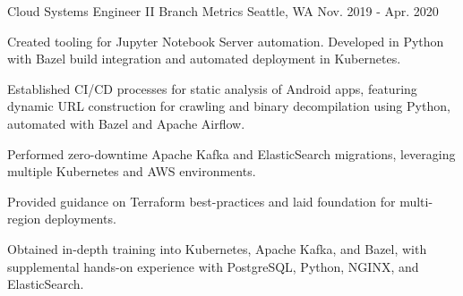 


\begin{cventries}

\cventry
{Cloud Systems Engineer II}
{Branch Metrics}
{Seattle, WA}
{Nov. 2019 - Apr. 2020}
{
\begin{cvitems}
\item {Created tooling for Jupyter Notebook Server automation. Developed in Python with Bazel build integration and automated deployment in Kubernetes.}
\item {Established CI/CD processes for static analysis of Android apps, featuring dynamic URL construction for crawling and binary decompilation using Python, automated with Bazel and Apache Airflow.}
\item {Performed zero-downtime Apache Kafka and ElasticSearch migrations, leveraging multiple Kubernetes and AWS environments.}
\item {Provided guidance on Terraform best-practices and laid foundation for multi-region deployments.}
\item {Obtained in-depth training into Kubernetes, Apache Kafka, and Bazel, with supplemental hands-on experience with PostgreSQL, Python, NGINX, and ElasticSearch.}
\end{cvitems}
}



\end{cventries}
